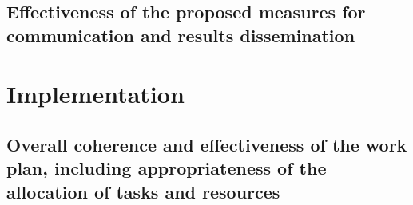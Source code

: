 \documentclass{article}[11pt]
\begin{document}
\subsection{Effectiveness of the proposed measures for communication and results dissemination}



\section{Implementation}
\subsection{Overall coherence and effectiveness of the work plan, including appropriateness of the allocation of tasks and resources}


\noindent
\end{document}
